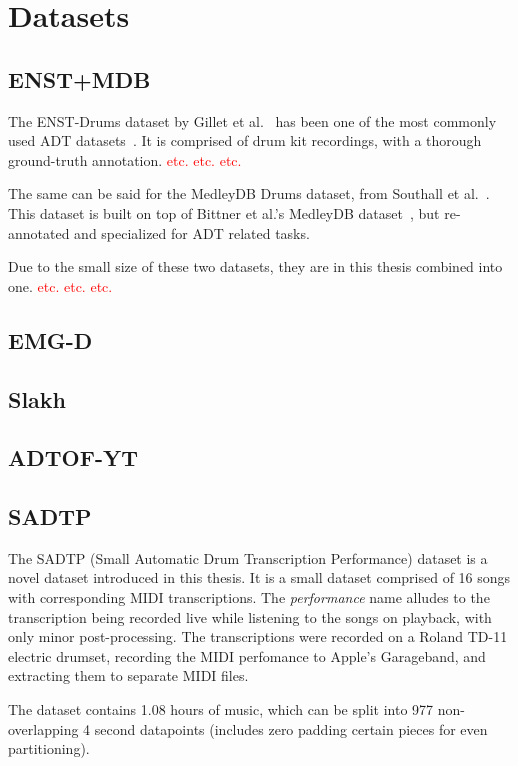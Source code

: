 \chapter{Datasets}

\section{ENST+MDB}

The ENST-Drums dataset by Gillet et al.~\cite{gillet_2006_7432188} has been one of the most commonly used \gls{ADT} datasets~\cite{8350302}. It is comprised of drum kit recordings, with a thorough ground-truth annotation.  \textcolor{red}{etc. etc. etc.}

The same can be said for the MedleyDB Drums dataset, from Southall et al.~\cite{southall2017mdb}. This dataset is built on top of Bittner et al.'s MedleyDB dataset~\cite{rachel_bittner_2014_1438309}, but re-annotated and specialized for \gls{ADT} related tasks.

Due to the small size of these two datasets, they are in this thesis combined into one. \textcolor{red}{etc. etc. etc.}

\section{EMG-D}

\section{Slakh}

\section{ADTOF-YT}

\section{SADTP}

The SADTP (Small Automatic Drum Transcription Performance) dataset is a novel dataset introduced in this thesis. It is a small dataset comprised of 16 songs with corresponding MIDI transcriptions. The \textit{performance} name alludes to the transcription being recorded live while listening to the songs on playback, with only minor post-processing. The transcriptions were recorded on a Roland TD-11 electric drumset, recording the MIDI perfomance to Apple's Garageband, and extracting them to separate MIDI files.

The dataset contains 1.08 hours of music, which can be split into 977 non-overlapping 4 second datapoints (includes zero padding certain pieces for even partitioning).